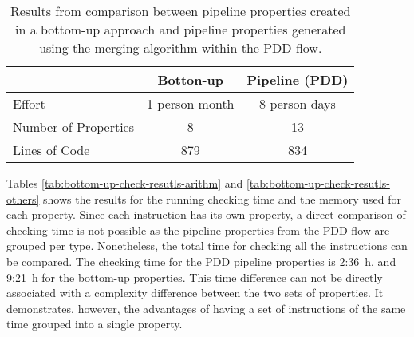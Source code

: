 \begin{table*}[htb!] 
	\centering 
	\caption{Results from comparison between pipeline properties created in a bottom-up approach and pipeline properties generated using the merging algorithm within the PDD flow.} 
	\label{tab:bottom-up-ppt-resutls}
	\begin{tabular}{p{5cm} c c} 
		  &  \textbf{Botton-up} & \textbf{Pipeline (PDD)} \\     
		\hline	
		Effort  &  1 person month &  8 person days\\
		Number of Properties  &  8 & 13 \\
		Lines of Code  & 879  &  834\\
	\end{tabular}
\end{table*}

Tables \ref{tab:bottom-up-check-resutls-arithm} and \ref{tab:bottom-up-check-resutls-others} shows the results for the running checking time and the memory used for each property. Since each instruction has its own property, a direct comparison of checking time is not possible as the pipeline properties from the PDD flow are grouped per type. Nonetheless, the total time for checking all the instructions can be compared. The checking time for the PDD pipeline properties is 2:36~h, and 9:21~h for the bottom-up properties. This time difference can not be directly associated with a complexity difference between the two sets of properties. It demonstrates, however, the advantages of having a set of instructions of the same time grouped into a single property.

